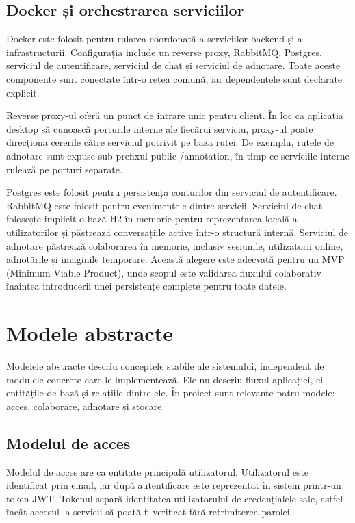 \subsection{Docker și orchestrarea serviciilor}
\label{subsec:docker}

Docker este folosit pentru rularea coordonată a serviciilor backend și a infrastructurii.
Configurația include un reverse proxy, RabbitMQ, Postgres, serviciul de autentificare, serviciul de chat și serviciul de adnotare.
Toate aceste componente sunt conectate într-o rețea comună, iar dependențele sunt declarate explicit.

Reverse proxy-ul oferă un punct de intrare unic pentru client.
În loc ca aplicația desktop să cunoască porturile interne ale fiecărui serviciu, proxy-ul poate direcționa cererile către serviciul potrivit pe baza rutei.
De exemplu, rutele de adnotare sunt expuse sub prefixul public /annotation, în timp ce serviciile interne rulează pe porturi separate.

Postgres este folosit pentru persistența conturilor din serviciul de autentificare.
RabbitMQ este folosit pentru evenimentele dintre servicii.
Serviciul de chat folosește implicit o bază H2 în memorie pentru reprezentarea locală a utilizatorilor și păstrează conversațiile active într-o structură internă.
Serviciul de adnotare păstrează colaborarea în memorie, inclusiv sesiunile, utilizatorii online, adnotările și imaginile temporare.
Această alegere este adecvată pentru un MVP (Minimum Viable Product), unde scopul este validarea fluxului colaborativ înaintea introducerii unei persistențe complete pentru toate datele.

\section{Modele abstracte}
\label{sec:modele-abstracte}

Modelele abstracte descriu conceptele stabile ale sistemului, independent de modulele concrete care le implementează.
Ele nu descriu fluxul aplicației, ci entitățile de bază și relațiile dintre ele.
În proiect sunt relevante patru modele: acces, colaborare, adnotare și stocare.

\subsection{Modelul de acces}
\label{subsec:model-acces}

Modelul de acces are ca entitate principală utilizatorul.
Utilizatorul este identificat prin email, iar după autentificare este reprezentat în sistem printr-un token JWT.
Tokenul separă identitatea utilizatorului de credențialele sale, astfel încât accesul la servicii să poată fi verificat fără retrimiterea parolei.

